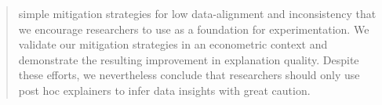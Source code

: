 \documentclass[12pt]{article}  %
\begin{document}
\begin{abstract}
simple mitigation strategies for low data-alignment and inconsistency that we encourage researchers to use as a foundation for experimentation. We validate our mitigation strategies in an econometric context and demonstrate the resulting improvement in explanation quality. Despite these efforts, we nevertheless conclude that researchers should only use post hoc explainers to infer data insights with great caution.


\end{abstract}%
%


\newpage
\end{document}
